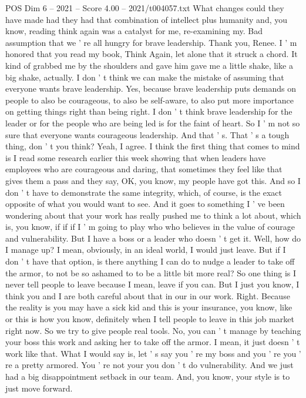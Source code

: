 \begin{textsample}{POS Dim 6 – 2021 – Score 4.00 – 2021/t004057.txt}
What changes could they have made had they had that combination of intellect plus humanity and, you know, reading think again was a catalyst for me, re-examining my.
Bad assumption that we ' re all hungry for brave leadership.
Thank you, Renee.
I ' m honored that you read my book, Think Again, let alone that it struck a chord.
It kind of grabbed me by the shoulders and gave him gave me a little shake, like a big shake, actually.
I don ' t think we can make the mistake of assuming that everyone wants brave leadership.
Yes, because brave leadership puts demands on people to also be courageous, to also be self-aware, to also put more importance on getting things right than being right.
I don ' t think brave leadership for the leader or for the people who are being led is for the faint of heart.
So I ' m not so sure that everyone wants courageous leadership.
And that ' s.
That ' s a tough thing, don ' t you think?
Yeah, I agree.
I think the first thing that comes to mind is I read some research earlier this week showing that when leaders have employees who are courageous and daring, that sometimes they feel like that gives them a pass and they say, OK, you know, my people have got this.
And so I don ' t have to demonstrate the same integrity, which, of course, is the exact opposite of what you would want to see.
And it goes to something I ' ve been wondering about that your work has really pushed me to think a lot about, which is, you know, if if if I ' m going to play who who believes in the value of courage and vulnerability.
But I have a boss or a leader who doesn ' t get it.
Well, how do I manage up?
I mean, obviously, in an ideal world, I would just leave.
But if I don ' t have that option, is there anything I can do to nudge a leader to take off the armor, to not be so ashamed to to be a little bit more real?
So one thing is I never tell people to leave because I mean, leave if you can.
But I just you know, I think you and I are both careful about that in our in our work.
Right.
Because the reality is you may have a sick kid and this is your insurance, you know, like or this is how you know, definitely when I tell people to leave in this job market right now.
So we try to give people real tools.
No, you can ' t manage by teaching your boss this work and asking her to take off the armor.
I mean, it just doesn ' t work like that.
What I would say is, let ' s say you ' re my boss and you ' re you ' re a pretty armored.
You ' re not your you don ' t do vulnerability.
And we just had a big disappointment setback in our team.
And, you know, your style is to just move forward.

\end{textsample}
